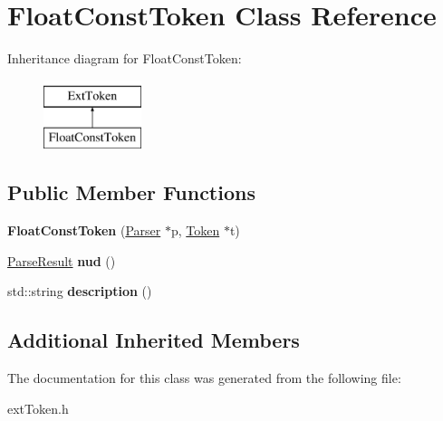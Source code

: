 \hypertarget{classFloatConstToken}{\section{Float\-Const\-Token Class Reference}
\label{classFloatConstToken}
}
Inheritance diagram for Float\-Const\-Token\-:\begin{figure}[H]
\begin{center}
\leavevmode
\includegraphics[height=2.000000cm]{classFloatConstToken}
\end{center}
\end{figure}
\subsection*{Public Member Functions}
\begin{DoxyCompactItemize}
\item 
\hypertarget{classFloatConstToken_aecee1d0e4e8a9410701c68c30858a4db}{{\bfseries Float\-Const\-Token} (\hyperlink{classParser}{Parser} $\ast$p, \hyperlink{classToken}{Token} $\ast$t)}\label{classFloatConstToken_aecee1d0e4e8a9410701c68c30858a4db}

\item 
\hypertarget{classFloatConstToken_a991e92ae34d0b01a3b1dd08ed01b8e6e}{\hyperlink{classParseResult}{Parse\-Result} {\bfseries nud} ()}\label{classFloatConstToken_a991e92ae34d0b01a3b1dd08ed01b8e6e}

\item 
\hypertarget{classFloatConstToken_a529b6d3ad479b0f6b940a82ba48b98c0}{std\-::string {\bfseries description} ()}\label{classFloatConstToken_a529b6d3ad479b0f6b940a82ba48b98c0}

\end{DoxyCompactItemize}
\subsection*{Additional Inherited Members}


The documentation for this class was generated from the following file\-:\begin{DoxyCompactItemize}
\item 
ext\-Token.\-h\end{DoxyCompactItemize}
